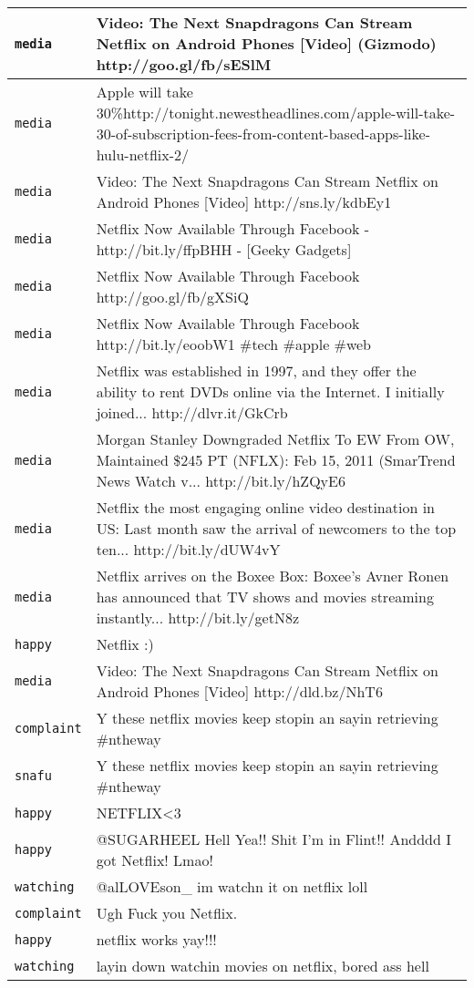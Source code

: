 \begin{center}
\begin{longtable}{|l|p{120mm}|}
         \texttt{media} & Video: The Next Snapdragons Can Stream Netflix on Android Phones [Video] (Gizmodo) http://goo.gl/fb/sESlM
      \tabularnewline\hline
         \texttt{media} & Apple will take 30\%http://tonight.newestheadlines.com/apple-will-take-30-of-subscription-fees-from-content-based-apps-like-hulu-netflix-2/
      \tabularnewline\hline
         \texttt{media} & Video: The Next Snapdragons Can Stream Netflix on Android Phones [Video] http://sns.ly/kdbEy1
      \tabularnewline\hline
         \texttt{media} & Netflix Now Available Through Facebook - http://bit.ly/ffpBHH - [Geeky Gadgets]
      \tabularnewline\hline
         \texttt{media} & Netflix Now Available Through Facebook http://goo.gl/fb/gXSiQ
      \tabularnewline\hline
         \texttt{media} & Netflix Now Available Through Facebook http://bit.ly/eoobW1 \#tech \#apple \#web
      \tabularnewline\hline
         \texttt{media} & Netflix was established in 1997, and they offer the ability to rent DVDs online via the Internet. I initially joined... http://dlvr.it/GkCrb
      \tabularnewline\hline
         \texttt{media} & Morgan Stanley Downgraded Netflix To EW From OW, Maintained \$245 PT (NFLX): Feb 15, 2011 (SmarTrend News Watch v... http://bit.ly/hZQyE6
      \tabularnewline\hline
         \texttt{media} & Netflix the most engaging online video destination in US: Last month saw the arrival of newcomers to the top ten... http://bit.ly/dUW4vY
      \tabularnewline\hline
         \texttt{media} & Netflix arrives on the Boxee Box: Boxee's Avner Ronen has announced that TV shows and movies streaming instantly... http://bit.ly/getN8z
      \tabularnewline\hline
         \texttt{happy} & Netflix :)
      \tabularnewline\hline
         \texttt{media} & Video: The Next Snapdragons Can Stream Netflix on Android Phones [Video] http://dld.bz/NhT6
      \tabularnewline\hline
         \texttt{complaint} & Y these netflix movies keep stopin an sayin retrieving \#ntheway
      \tabularnewline\hline
         \texttt{snafu} & Y these netflix movies keep stopin an sayin retrieving \#ntheway
      \tabularnewline\hline
         \texttt{happy} & NETFLIX<3
      \tabularnewline\hline
         \texttt{happy} & @SUGARHEEL Hell Yea!! Shit I'm in Flint!! Andddd I got Netflix! Lmao!
      \tabularnewline\hline
         \texttt{watching} & @alLOVEson\_ im watchn it on netflix loll
      \tabularnewline\hline
         \texttt{complaint} & Ugh Fuck you Netflix.
      \tabularnewline\hline
         \texttt{happy} & netflix works yay!!!
      \tabularnewline\hline
         \texttt{watching} & layin down watchin movies on netflix, bored ass hell

\end{longtable}
\end{center}
